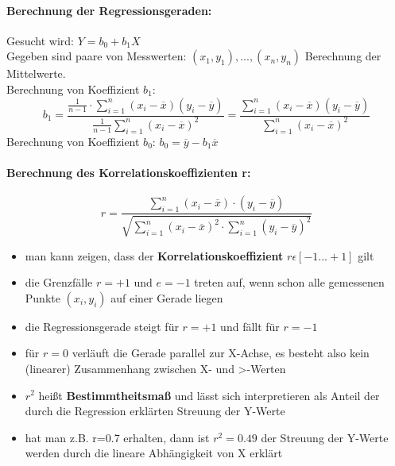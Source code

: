 \paragraph{Berechnung der Regressionsgeraden:}
Gesucht wird: $Y=b_{0}+b_{1}X$ \\
Gegeben sind paare von Messwerten: $(x_{1},y_{1}),...,(x_{n},y_{n})$
Berechnung der Mittelwerte. \\
Berechnung von Koeffizient $b_{1}$:
\begin{equation}
b_{1}=\frac{\frac{1}{n-1}\cdot\sum_{i=1}^{n}(x_{i}-\overline{x})(y_{i}-\overline{y})}{\frac{1}{n-1}\sum_{i=1}^{n}(x_{i}-\overline{x})^2} = \frac{\sum_{i=1}^{n}(x_{i}-\overline{x})(y_{i}-\overline{y})}{\sum_{i=1}^{n}(x_{i}-\overline{x})^2}
\end{equation}
Berechnung von Koeffizient $b_{0}$: $b_{0} = \overline{y} - b_{1}\overline{x}$

\paragraph{Berechnung des Korrelationskoeffizienten r:}

\begin{equation}
	r = \frac{\sum_{i=1}^{n}(x_{i}-\overline{x})\cdot(y_{i}-\overline{y})}{\sqrt{\sum_{i=1}^{n}(x_{i}-\overline{x})^2\cdot\sum_{i=1}^{n}(y_{i}-\overline{y})^2}}
\end{equation}

\begin{itemize}
	\item man kann zeigen, dass der \textbf{Korrelationskoeffizient} $r \epsilon [-1...+1]$ gilt
	\item die Grenzfälle $r=+1$ und $e=-1$ treten auf, wenn schon alle gemessenen Punkte $(x_{i},y_{i})$ auf einer Gerade liegen
	\item die Regressionsgerade steigt für $r=+1$ und fällt für $r=-1$
	\item für $r=0$ verläuft die Gerade parallel zur X-Achse, es besteht also kein (linearer) Zusammenhang zwischen X- und >-Werten
	\item $r^2$ heißt \textbf{Bestimmtheitsmaß} und lässt sich interpretieren als Anteil der durch die Regression erklärten Streuung der Y-Werte
	\item hat man z.B. r=0.7 erhalten, dann ist $r^2=0.49$ der Streuung der Y-Werte werden durch die lineare Abhängigkeit von X erklärt
\end{itemize}

